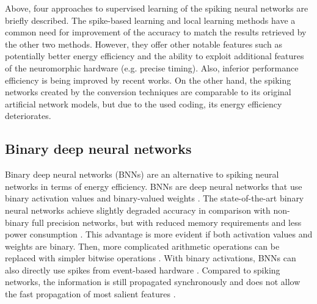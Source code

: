 Above, four approaches to supervised learning of the spiking neural networks are briefly described. The spike-based learning and local learning methods have a common need for improvement of the accuracy to match the results retrieved by the other two methods. However, they offer other notable features such as potentially better energy efficiency and the ability to exploit additional features of the neuromorphic hardware (e.g. precise timing). Also, inferior performance efficiency is being improved by recent works. On the other hand, the spiking networks created by the conversion techniques are comparable to its original artificial network models, but due to the used coding, its energy efficiency deteriorates.

\subsection{Binary deep neural networks}
Binary deep neural networks (BNNs) are an alternative to spiking neural networks in terms of energy efficiency. BNNs are deep neural networks that use binary activation values and binary-valued weights \cite{simonsReviewBinarized19}. The state-of-the-art binary neural networks achieve slightly degraded accuracy in comparison with non-binary full precision networks, but with reduced memory requirements and less power consumption \cite{courbariauxBinarizedNeural16}. This advantage is more evident if both activation values and weights are binary. Then, more complicated arithmetic operations can be replaced with simpler bitwise operations \cite{kimBitwiseNeural16}. With binary activations, BNNs can also directly use spikes from event-based hardware \cite{linAccurateBinary17}. Compared to spiking networks, the information is still propagated synchronously and does not allow the fast propagation of most salient features \cite{pfeifferDeepLearningSpiking2018}.

